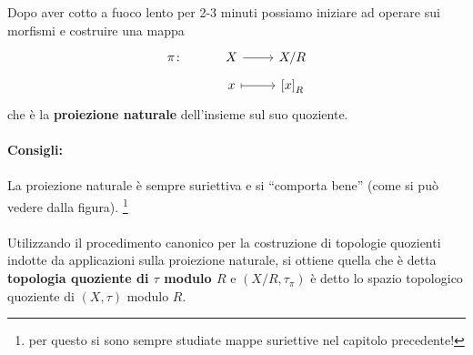 Dopo aver cotto a fuoco lento per 2-3 minuti possiamo iniziare ad operare sui morfismi e costruire una mappa 
\begin{equation*}
\begin{tikzcd}[row sep = tiny]
	\pi  \colon &  X \arrow{r} & X/R \\
		 & x \arrow[mapsto]{r} & \left[x\right]_R
\end{tikzcd}
\end{equation*}
che è la \textbf{proiezione naturale} dell'insieme sul suo quoziente.\\  \\
 {\Large \textbf{Consigli:}} 
\\
\\
La proiezione naturale è sempre suriettiva  e si \enquote{comporta bene} (come si può vedere dalla figura).
\footnote{per questo si sono sempre studiate mappe suriettive nel capitolo precedente!}
 \\ \\ Utilizzando il procedimento canonico per la costruzione di topologie quozienti indotte da applicazioni sulla proiezione naturale, si ottiene quella che è detta \textbf{topologia quoziente di $\tau$ modulo $R$} e $(X/R, \tau_\pi)$ è detto lo spazio topologico quoziente di $(X,\tau)$ modulo $R$. 


